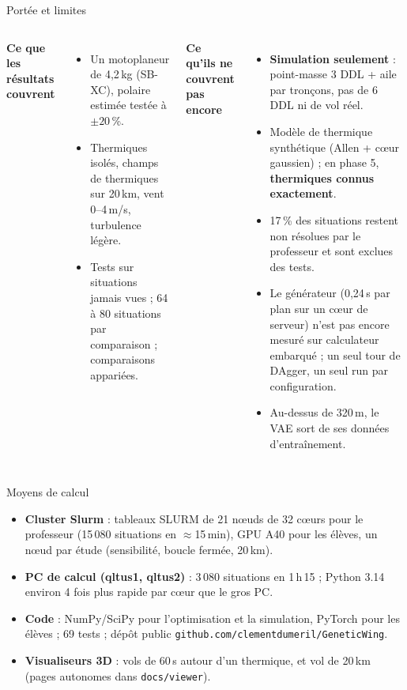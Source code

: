 \documentclass[aspectratio=169,10pt]{beamer}
\newcommand{\bad}[1]{\textcolor{sink}{\textbf{#1}}}
\begin{document}
\begin{frame}{Portée et limites}
  \begin{columns}[T]
    \textbf{Ce que les résultats couvrent}
    \small
    \begin{itemize}
      \item Un motoplaneur de 4{,}2\,kg (SB-XC), polaire estimée testée à $\pm20$\,\%.
      \item Thermiques isolés, champs de thermiques sur 20\,km, vent 0--4\,m/s, turbulence légère.
      \item Tests sur situations jamais vues ; 64 à 80 situations par comparaison ; comparaisons appariées.
    \end{itemize}
    \textbf{Ce qu'ils ne couvrent pas encore}
    \small
    \begin{itemize}
      \item \bad{Simulation seulement} : point-masse 3 DDL + aile par tronçons, pas de 6 DDL ni de vol réel.
      \item Modèle de thermique synthétique (Allen + cœur gaussien) ; en phase 5, \bad{thermiques connus exactement}.
      \item 17\,\% des situations restent non résolues par le professeur et sont exclues des tests.
      \item Le générateur (0{,}24\,s par plan sur un cœur de serveur) n'est pas encore mesuré sur calculateur embarqué ; un seul tour de DAgger, un seul run par configuration.
      \item Au-dessus de 320\,m, le VAE sort de ses données d'entraînement.
    \end{itemize}
  \end{columns}
\end{frame}

\begin{frame}{Moyens de calcul}
  \small
  \begin{itemize}
    \item \textbf{Cluster Slurm} : tableaux SLURM de 21 n\oe uds de 32 c\oe urs pour le professeur (15\,080 situations en $\approx$15\,min), GPU A40 pour les élèves, un n\oe ud par étude (sensibilité, boucle fermée, 20\,km).
    \item \textbf{PC de calcul (qltus1, qltus2)} : 3\,080 situations en 1\,h\,15 ; Python 3.14 environ 4 fois plus rapide par c\oe ur que le gros PC.
    \item \textbf{Code} : NumPy/SciPy pour l'optimisation et la simulation, PyTorch pour les élèves ; 69 tests ; dépôt public \texttt{github.com/clementdumeril/GeneticWing}.
    \item \textbf{Visualiseurs 3D} : vols de 60\,s autour d'un thermique, et vol de 20\,km (pages autonomes dans \texttt{docs/viewer}).
  \end{itemize}
\end{frame}
\end{document}
